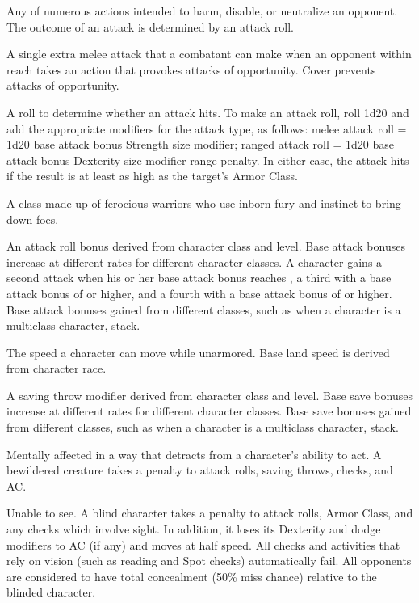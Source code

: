  Any of numerous 
actions intended to harm, disable, or neutralize an opponent. 
The outcome of an attack is 
determined by an attack roll. 

  A single extra melee attack that a combatant can 
make when an opponent within 
reach takes an action that provokes 
attacks of opportunity. Cover prevents attacks of opportunity. 

 A roll to determine 
whether an attack hits. To make 
an attack roll, roll 1d20 and add 
the appropriate modifiers for the 
attack type, as follows: melee attack roll 
= 1d20 \add base attack bonus \add Strength \add size modifier; ranged attack roll = 1d20 \add 
base attack bonus \add Dexterity \add size modifier \add range penalty. In either case, the attack hits if 
the result is at least as high as the target's Armor Class. 

 A class made up of ferocious warriors who use 
inborn fury and instinct to bring down foes. 

 An attack roll bonus derived from character 
class and level. Base attack bonuses increase at different rates for 
different character classes. A character gains a second attack when 
his or her base attack bonus reaches , a third with a base attack 
bonus of  or higher, and a fourth with a base attack bonus of  
or higher. Base attack bonuses gained from different classes, such as 
when a character is a multiclass character, stack. 

 The speed a character can move while unarmored. Base land speed is derived from character race. 

 A saving throw modifier derived from character class and level. Base save bonuses increase at different rates for 
different character classes. Base save bonuses gained from 
different classes, such as when a character is a multiclass 
character, stack. 

 Mentally affected in a way that detracts from a character's ability to act. A bewildered creature takes a  penalty to attack rolls, saving throws, checks, and AC.

 Unable to see. A blind character takes a  penalty to attack rolls, Armor Class, and any checks which involve sight. In addition, it loses its Dexterity and dodge modifiers to AC (if any) and moves at half speed. All checks and activities that rely on vision (such as reading and Spot checks) automatically fail. All opponents are considered to have total concealment (50\% miss chance) relative to the blinded character. 

